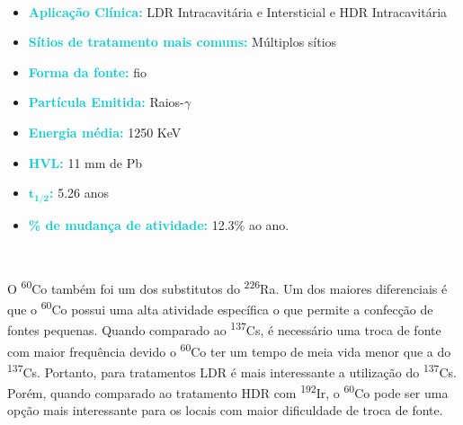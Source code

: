 \documentclass[11pt,a4paper]{article}
\begin{document}
			\

		
	\begin{tcolorbox}[width=\textwidth, colback={white}, colbacktitle={DarkTurquoise!50!white}, title={$\bigstar$ \LobsterTwo{Cobalto 60} $\bigstar$}, coltitle={CarnationPink}, colframe={DarkTurquoise}, fonttitle=\rmfamily\bfseries\Large, breakable]

			\begin{itemize}
				\item \textcolor{DarkTurquoise}{\textbf{Aplicação Clínica:}} LDR Intracavitária e Intersticial e HDR Intracavitária
				\item \textcolor{DarkTurquoise}{\textbf{Sítios de tratamento mais comuns:}} Múltiplos sítios
				\item \textcolor{DarkTurquoise}{\textbf{Forma da fonte:}} fio
				\item \textcolor{DarkTurquoise}{\textbf{Partícula Emitida:}} Raios-$\gamma$
				\item \textcolor{DarkTurquoise}{\textbf{Energia média:}} 1250 KeV
				\item \textcolor{DarkTurquoise}{\textbf{HVL:}} 11 mm de Pb
				\item \textcolor{DarkTurquoise}{\textbf{$\mathbf{t_{1/2}}$:}} 5.26 anos
				\item \textcolor{DarkTurquoise}{\textbf{\% de mudança de atividade:}} 12.3\% ao ano.
			\end{itemize}
	\end{tcolorbox}

			\

			O \textsuperscript{60}Co também foi um dos substitutos do \textsuperscript{226}Ra. Um dos maiores diferenciais é que o \textsuperscript{60}Co possui uma alta atividade específica o que permite a confecção de fontes pequenas. Quando comparado ao \textsuperscript{137}Cs, é necessário uma troca de fonte com maior frequência devido o \textsuperscript{60}Co ter um tempo de meia vida menor que a do \textsuperscript{137}Cs. Portanto, para tratamentos LDR é mais interessante a utilização do \textsuperscript{137}Cs. Porém, quando comparado ao tratamento HDR com \textsuperscript{192}Ir, o \textsuperscript{60}Co pode ser uma opção mais interessante para os locais com maior dificuldade de troca de fonte.

			\
\end{document}
